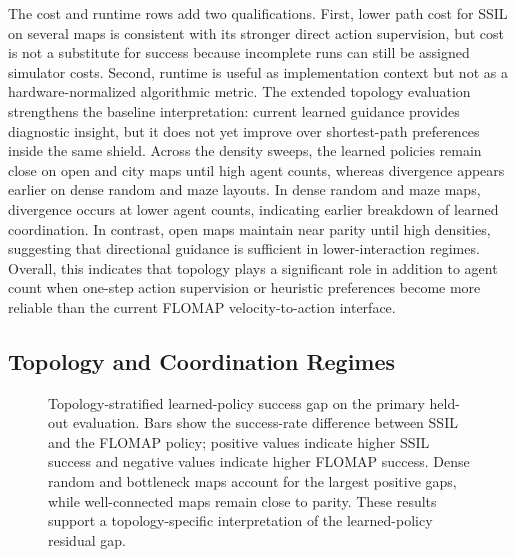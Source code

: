\documentclass[conference]{IEEEtran}
\begin{document}
The cost and runtime rows add two qualifications.  First, lower path cost for
SSIL on several maps is consistent with its stronger direct action supervision,
but cost is not a substitute for success because incomplete runs can still be
assigned simulator costs.  Second, runtime is useful as implementation context
but not as a hardware-normalized algorithmic metric.  The extended topology
evaluation strengthens the baseline interpretation: current learned guidance
provides diagnostic insight, but it does not yet improve over
shortest-path preferences inside the same shield.
Across the density sweeps, the learned policies remain close on open and city
maps until high agent counts, whereas divergence appears earlier on dense random
and maze layouts.  In dense random and maze maps, divergence occurs at lower
agent counts, indicating earlier breakdown of learned coordination.  In
contrast, open maps maintain near parity until high densities, suggesting that
directional guidance is sufficient in lower-interaction regimes.  Overall, this
indicates that topology plays a significant role in addition to agent count when
one-step action supervision or heuristic preferences become more reliable than
the current FLOMAP velocity-to-action interface.

\subsection{Topology and Coordination Regimes}

\begin{figure}[!tbp]
\centering
\resizebox{0.88\textwidth}{!}{}
\caption{Topology-stratified learned-policy success gap on the primary held-out
evaluation.  Bars show the success-rate difference between SSIL and the
FLOMAP policy; positive values indicate higher SSIL success and negative
values indicate higher FLOMAP success.  Dense random and bottleneck maps
account for the largest positive gaps, while well-connected maps remain close to
parity.  These results support a
topology-specific interpretation of the learned-policy residual gap.}
\label{fig:topology-regime}
\end{figure}

\begin{table}[!tbp]
\centering
\caption{Primary held-out success with and without coordination-heavy
maps.  The final column reports paired McNemar tests on matched evaluation
instances.}
\label{tab:coord-slices}

\end{table}
\end{document}
